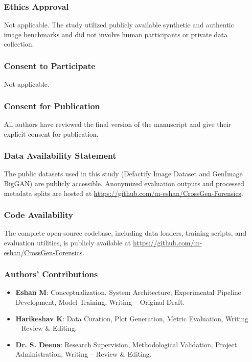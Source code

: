 \documentclass[pdflatex,sn-mathphys-num]{sn-jnl}
\theoremstyle{thmstyleone}
\theoremstyle{thmstyletwo}
\theoremstyle{thmstylethree}
\begin{document}
\subsubsection*{Ethics Approval}
Not applicable. The study utilized publicly available synthetic and authentic image benchmarks and did not involve human participants or private data collection.

\subsubsection*{Consent to Participate}
Not applicable.

\subsubsection*{Consent for Publication}
All authors have reviewed the final version of the manuscript and give their explicit consent for publication.

\subsubsection*{Data Availability Statement}
The public datasets used in this study (Defactify Image Dataset and GenImage BigGAN) are publicly accessible. Anonymized evaluation outputs and processed metadata splits are hosted at \url{https://github.com/m-eshan/CrossGen-Forensics}.

\subsubsection*{Code Availability}
The complete open-source codebase, including data loaders, training scripts, and evaluation utilities, is publicly available at \url{https://github.com/m-eshan/CrossGen-Forensics}.

\subsubsection*{Authors' Contributions}
\begin{itemize}
    \item \textbf{Eshan M}: Conceptualization, System Architecture, Experimental Pipeline Development, Model Training, Writing -- Original Draft.
    \item \textbf{Harikeshav K}: Data Curation, Plot Generation, Metric Evaluation, Writing -- Review \& Editing.
    \item \textbf{Dr. S. Deena}: Research Supervision, Methodological Validation, Project Administration, Writing -- Review \& Editing.
\end{itemize}


\end{document}

